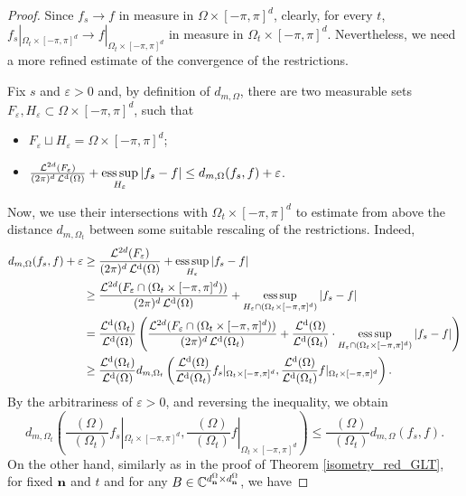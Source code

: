 \documentclass[10pt,a4paper]{amsart}
\DeclareMathOperator{\Ld}{\mathcal{L}^d}
\begin{document}
\begin{proof}
   Since $f_s\to f$ in measure in $\Omega\times[-\pi,\pi]^d$, clearly, for every $t$, $f_s|_{\Omega_t\times[-\pi,\pi]^d}\to f|_{\Omega_t\times[-\pi,\pi]^d}$ in measure in $\Omega_t\times[-\pi,\pi]^d$. Nevertheless, we need a more refined estimate of the convergence of the restrictions.
   
   Fix $s$ and $\varepsilon>0$ and, by definition of $d_{m,\Omega}$, there are two measurable sets $F_\varepsilon,H_\varepsilon\subset\Omega\times[-\pi,\pi]^d$, such that
   \begin{itemize}
       \item $F_\varepsilon\sqcup H_\varepsilon=\Omega\times[-\pi,\pi]^d$;
       \item $\frac{\mathcal{L}^{2d}(F_\varepsilon)}{(2\pi)^d\Ld(\Omega)}+\esssup\limits_{H_\varepsilon}|f_s-f|\leq d_{m,\Omega}(f_s,f)+\varepsilon$.
   \end{itemize}
   Now, we use their intersections with $\Omega_t\times[-\pi,\pi]^d$ to estimate from above the distance $d_{m,\Omega_t}$ between some suitable rescaling of the restrictions. Indeed,
   \begin{align*}
       d_{m,\Omega}(f_s,f)+\varepsilon&\geq \frac{\mathcal{L}^{2d}(F_\varepsilon)}{(2\pi)^d\Ld(\Omega)}+\esssup\limits_{H_\varepsilon}|f_s-f|\\
       &\geq \frac{\mathcal{L}^{2d}(F_\varepsilon\cap(\Omega_t\times[-\pi,\pi]^d))}{(2\pi)^d\Ld(\Omega)}+\esssup\limits_{H_\varepsilon\cap(\Omega_t\times[-\pi,\pi]^d)}|f_s-f|\\
       &=\frac{\Ld(\Omega_t)}{\Ld(\Omega)}\left(\frac{\mathcal{L}^{2d}(F_\varepsilon\cap(\Omega_t\times[-\pi,\pi]^d))}{(2\pi)^d\Ld(\Omega_t)}+\frac{\Ld(\Omega)}{\Ld(\Omega_t)}\cdot\esssup\limits_{H_\varepsilon\cap(\Omega_t\times[-\pi,\pi]^d)}|f_s-f|\right)\\
       &\geq \frac{\Ld(\Omega_t)}{\Ld(\Omega)}d_{m,\Omega_t}\left(\frac{\Ld(\Omega)}{\Ld(\Omega_t)}f_s|_{\Omega_t\times[-\pi,\pi]^d},\frac{\Ld(\Omega)}{\Ld(\Omega_t)}f|_{\Omega_t\times[-\pi,\pi]^d}\right).
   \end{align*}
   By the arbitrariness of $\varepsilon>0$, and reversing the inequality, we obtain
   \begin{equation}\label{acs_eq_4}
       d_{m,\Omega_t}\left(\frac{\Ld(\Omega)}{\Ld(\Omega_t)}f_s|_{\Omega_t\times[-\pi,\pi]^d},\frac{\Ld(\Omega)}{\Ld(\Omega_t)}f|_{\Omega_t\times[-\pi,\pi]^d}\right)\leq \frac{\Ld(\Omega)}{\Ld(\Omega_t)} d_{m,\Omega}(f_s,f).
   \end{equation}
   On the other hand, similarly as in the proof of Theorem \ref{isometry_red_GLT}, for fixed $\mathbf n$ and $t$ and for any $B\in\mathbb{C}^{d_\mathbf n^{\Omega}\times d_\mathbf n^{\Omega}}$, we have

\end{proof}
\end{document}

